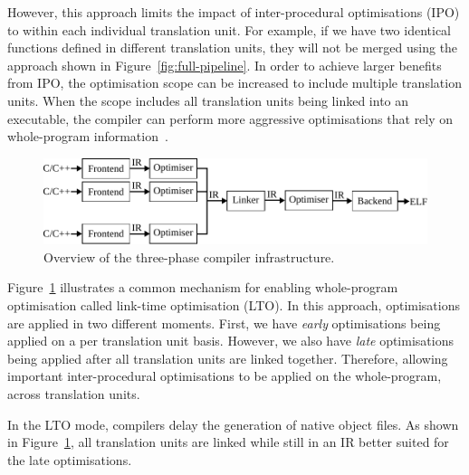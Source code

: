 However, this approach limits the impact of inter-procedural optimisations (IPO) to within each individual translation unit.
For example, if we have two identical functions defined in different translation units, they will not be merged using the approach shown in Figure~\ref{fig:full-pipeline}.
In order to achieve larger benefits from IPO, the optimisation scope can be increased to include multiple translation units.
When the scope includes all translation units being linked into an executable, the compiler can perform  more aggressive optimisations that rely on whole-program information~\cite{johnson17}.

\begin{figure}[h]
  \centering
  \includegraphics[scale=0.85]{src/background/figs/full-pipeline-LTO.pdf}
  \caption{Overview of the three-phase compiler infrastructure.}
  \label{fig:full-LTO-pipeline}
\end{figure}

Figure~\ref{fig:full-LTO-pipeline} illustrates a common mechanism for enabling whole-program optimisation called link-time optimisation (LTO).
In this approach, optimisations are applied in two different moments.
First, we have \textit{early} optimisations being applied on a per translation unit basis.
However, we also have \textit{late} optimisations being applied after all translation units are linked together.
Therefore, allowing important inter-procedural optimisations to be applied on the whole-program, across translation units.

In the LTO mode, compilers delay the generation of native object files.
As shown in Figure~\ref{fig:full-LTO-pipeline}, all translation units are linked while still in an IR better suited for the late optimisations.
